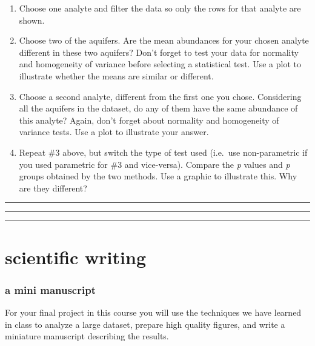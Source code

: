 \documentclass[
]{krantz}
\begin{document}
\begin{enumerate}
\def\labelenumi{\arabic{enumi}.}
\item
  Choose one analyte and filter the data so only the rows for that analyte are shown.
\item
  Choose two of the aquifers. Are the mean abundances for your chosen analyte different in these two aquifers? Don't forget to test your data for normality and homogeneity of variance before selecting a statistical test. Use a plot to illustrate whether the means are similar or different.
\item
  Choose a second analyte, different from the first one you chose. Considering all the aquifers in the dataset, do any of them have the same abundance of this analyte? Again, don't forget about normality and homogeneity of variance tests. Use a plot to illustrate your answer.
\item
  Repeat \#3 above, but switch the type of test used (i.e.~use non-parametric if you used parametric for \#3 and vice-versa). Compare the \emph{p} values and \emph{p} groups obtained by the two methods. Use a graphic to illustrate this. Why are they different?
\end{enumerate}

\begin{center}\rule{0.5\linewidth}{0.5pt}\end{center}

\begin{center}\rule{0.5\linewidth}{0.5pt}\end{center}

\begin{center}\rule{0.5\linewidth}{0.5pt}\end{center}

\hypertarget{part-scientific-writing}{%
\part{scientific writing}\label{part-scientific-writing}}

\hypertarget{a-mini-manuscript}{%
\section*{a mini manuscript}\label{a-mini-manuscript}}

For your final project in this course you will use the techniques we have learned in class to analyze a large dataset, prepare high quality figures, and write a miniature manuscript describing the results.
\end{document}
